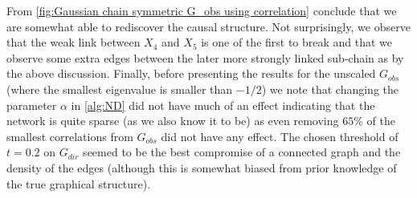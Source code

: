 \documentclass[../Thesis.tex]{subfiles}
\begin{document}
From \autoref{fig:Gaussian chain symmetric G_obs using correlation} conclude that we are somewhat able to rediscover the causal structure. Not surprisingly, we observe that the weak link between $X_4$ and $X_5$ is one of the first to break and that we observe some extra edges between the later more strongly linked sub-chain as by the above discussion. Finally, before presenting the results for the unscaled $G_{obs}$ (where the smallest eigenvalue is smaller than $-1/2$) we note that changing the parameter $\alpha$ in \autoref{alg:ND} did not have much of an effect indicating that the network is quite sparse (as we also know it to be) as even removing $65\%$ of the smallest correlations from $G_{obs}$ did not have any effect. The chosen threshold of $t=0.2$ on $G_{dir}$ seemed to be the best compromise of a connected graph and the density of the edges (although this is somewhat biased from prior knowledge of the true graphical structure).
\end{document}
